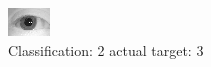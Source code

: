 \begin{figure}[h!]
\begin{center}
\includegraphics[width=0.60\columnwidth]{figures/ID1202_class_2_target_3.png}
\end{center}
\caption{ Classification: 2 actual target: 3}
\label{fig:ID1202_class_2_target_3}
\end{figure}
